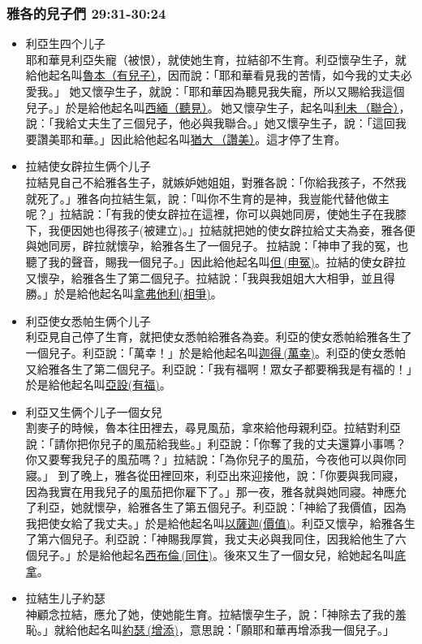 \subsubsection{雅各的兒子們 29:31-30:24} 

\begin{itemize} 
\itemsep-.35em 
\item 利亞生四个儿子\\
耶和華見利亞失寵（被恨），就使她生育，拉結卻不生育。利亞懷孕生子，就給他起名叫\underline{魯本（有兒子）}，因而說：「耶和華看見我的苦情，如今我的丈夫必愛我。」 她又懷孕生子，就說：「耶和華因為聽見我失寵，所以又賜給我這個兒子。」於是給他起名叫\underline{西緬（聽見）}。 她又懷孕生子，起名叫\underline{利未 （聯合）}，說：「我給丈夫生了三個兒子，他必與我聯合。」她又懷孕生子，說：「這回我要讚美耶和華。」因此給他起名叫\underline{猶大 （讚美）}。這才停了生育。
\item 拉結使女辟拉生俩个儿子\\
拉結見自己不給雅各生子，就嫉妒她姐姐，對雅各說：「你給我孩子，不然我就死了。」雅各向拉結生氣，說：「叫你不生育的是神，我豈能代替他做主呢？」拉結說：「有我的使女辟拉在這裡，你可以與她同房，使她生子在我膝下，我便因她也得孩子(被建立)。」拉結就把她的使女辟拉給丈夫為妾，雅各便與她同房，辟拉就懷孕，給雅各生了一個兒子。 拉結說：「神申了我的冤，也聽了我的聲音，賜我一個兒子。」因此給他起名叫\underline{但 (申冤)}。拉結的使女辟拉又懷孕，給雅各生了第二個兒子。拉結說：「我與我姐姐大大相爭，並且得勝。」於是給他起名叫\underline{拿弗他利(相爭)}。
\item 利亞使女悉帕生俩个儿子\\
利亞見自己停了生育，就把使女悉帕給雅各為妾。利亞的使女悉帕給雅各生了一個兒子。利亞說：「萬幸！」於是給他起名叫\underline{迦得 (萬幸)}。利亞的使女悉帕又給雅各生了第二個兒子。利亞說：「我有福啊！眾女子都要稱我是有福的！」於是給他起名叫\underline{亞設(有福)}。
\item 利亞又生俩个儿子一個女兒\\
割麥子的時候，魯本往田裡去，尋見風茄，拿來給他母親利亞。拉結對利亞說：「請你把你兒子的風茄給我些。」利亞說：「你奪了我的丈夫還算小事嗎？你又要奪我兒子的風茄嗎？」拉結說：「為你兒子的風茄，今夜他可以與你同寢。」 到了晚上，雅各從田裡回來，利亞出來迎接他，說：「你要與我同寢，因為我實在用我兒子的風茄把你雇下了。」那一夜，雅各就與她同寢。神應允了利亞，她就懷孕，給雅各生了第五個兒子。利亞說：「神給了我價值，因為我把使女給了我丈夫。」於是給他起名叫\underline{以薩迦(價值)}。利亞又懷孕，給雅各生了第六個兒子。利亞說：「神賜我厚賞，我丈夫必與我同住，因我給他生了六個兒子。」於是給他起名\underline{西布倫 (同住)}。後來又生了一個女兒，給她起名叫\underline{底拿}。
\item 拉結生儿子約瑟\\%
神顧念拉結，應允了她，使她能生育。拉結懷孕生子，說：「神除去了我的羞恥。」就給他起名叫\underline{約瑟 (增添)}，意思說：「願耶和華再增添我一個兒子。」
\end{itemize}


